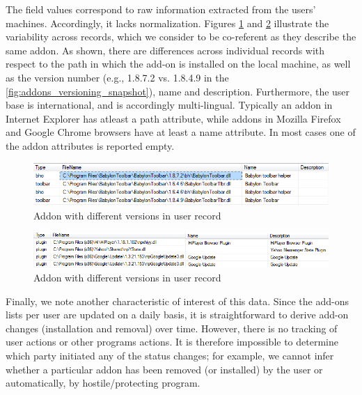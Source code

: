 \documentclass[11pt,oneside]{book}
\begin{document}
The field values correspond to raw information extracted from the users' machines. Accordingly, it lacks normalization. Figures \ref{fig:addons_versioning_snapshot} and \ref{fig:addons_versioning_snapshot_desc} illustrate the variability across records, which we consider to be co-referent as they describe the same addon. As shown, there are differences across individual records with respect to the path in which the add-on is installed on the local machine, as well as the version number (e.g., 1.8.7.2 vs. 1.8.4.9 in the \autoref{fig:addons_versioning_snapshot}), name and description. Furthermore, the user base is international, and is accordingly multi-lingual.   Typically an addon in Internet Explorer has atleast a path attribute, while addons in Mozilla Firefox and Google Chrome browsers have at least a name attribute. In most cases one of the addon attributes is reported empty.

\begin{figure}[t]
\centering
\begin{small}
\includegraphics[scale=.8,angle=0]{figures/addons_versioning_snapshot.png}
\end{small}
\caption{Addon with different versions in user record}
\label{fig:addons_versioning_snapshot}
\end{figure}

\begin{figure}[t]
\centering
\begin{small}
\includegraphics[scale=.8,angle=0]{figures/addons_versioning_snapshot_desc.png}
\end{small}
\caption{Addon with different versions in user record}
\label{fig:addons_versioning_snapshot_desc}
\end{figure}

Finally, we note another characteristic of interest of this data.  Since the add-ons lists per user are updated on a daily basis, it is straightforward to derive add-on changes (installation and removal) over time. However, there is no tracking of user actions or other programs actions. It is therefore impossible to determine which party initiated any of the status changes; for example, we cannot infer whether a particular addon has been removed (or installed) by the user or automatically, by hostile/protecting program. 
\end{document}
